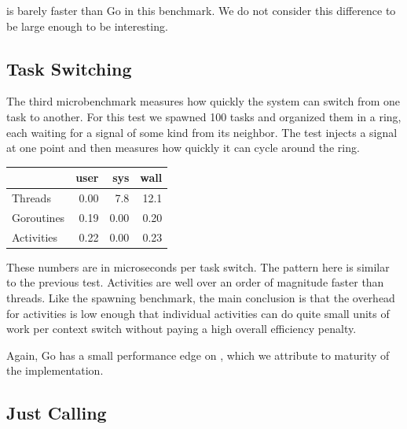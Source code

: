 \documentclass[9pt,preprint]{sigplanconf-2}
\begin{document}
\charcoal{} is barely faster than Go in this benchmark.
We do not consider this difference to be large enough to be interesting.

\subsection{Task Switching}

The third microbenchmark measures how quickly the system can switch from one task to another.
For this test we spawned 100 tasks and organized them in a ring, each waiting for a signal of some kind from its neighbor.
The test injects a signal at one point and then measures how quickly it can cycle around the ring.

\vspace{1em}
\begin{tabular}{|l|r|r|r|}
  \hline
   & user & sys & wall \\
  \hline
  \hline
  Threads & 0.00 & 7.8 & 12.1 \\
  \hline
  Goroutines & 0.19 & 0.00 & 0.20 \\
  \hline
  Activities & 0.22 & 0.00 & 0.23 \\
  \hline
\end{tabular}
\vspace{1em}

These numbers are in microseconds per task switch.
The pattern here is similar to the previous test.
Activities are well over an order of magnitude faster than threads.
Like the spawning benchmark, the main conclusion is that the overhead for activities is low enough that individual activities can do quite small units of work per context switch without paying a high overall efficiency penalty.

Again, Go has a small performance edge on \charcoal{}, which we attribute to maturity of the implementation.

\subsection{Just Calling}
\end{document}
